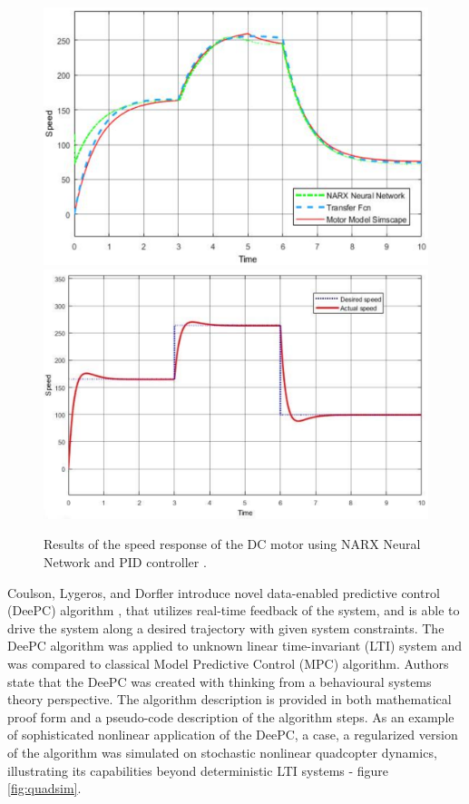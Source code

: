 \documentclass[]{final_report}
\begin{document}
\begin{figure}
\centerline{
\includegraphics[width=.47\textwidth]{Screenshots for related work/2.png}\hfill
\label{NARX ANN}
\includegraphics[width=.49\textwidth]{Screenshots for related work/3.png}
\label{PID controller}
}
\caption{Results of the speed response of the DC motor using NARX Neural Network and PID controller \cite{naung2018a}.}
\label{fig:pidcomparison}
\end{figure}

Coulson, Lygeros, and Dorfler introduce novel data-enabled predictive
control (DeePC) algorithm \cite{coulson2019data}, that utilizes real-time feedback of the system, and is able to drive the system along a desired trajectory with given system constraints. The DeePC  algorithm  was  applied  to unknown linear time-invariant (LTI)  system  and was compared to classical Model  Predictive  Control (MPC) algorithm. Authors state that the DeePC was created with thinking from a behavioural systems theory perspective. The algorithm description is provided in both mathematical proof form and a pseudo-code description of the algorithm steps. As an example of sophisticated nonlinear application of the DeePC, a case, a regularized version of the algorithm was simulated on  stochastic nonlinear quadcopter dynamics, illustrating its capabilities beyond deterministic LTI systems - figure \ref{fig:quadsim}.
\end{document}
